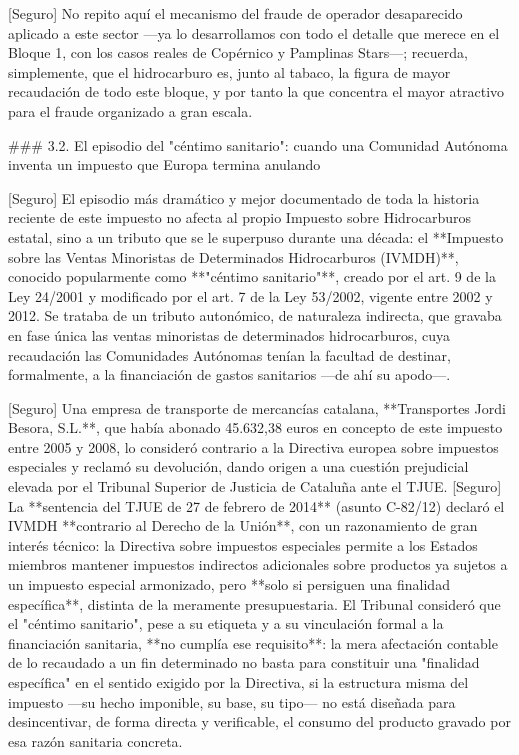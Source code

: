 \documentclass[10pt,a4paper]{article}
\begin{document}
[Seguro] No repito aquí el mecanismo del fraude de operador desaparecido aplicado a este sector —ya lo desarrollamos con todo el detalle que merece en el Bloque 1, con los casos reales de Copérnico y Pamplinas Stars—; recuerda, simplemente, que el hidrocarburo es, junto al tabaco, la figura de mayor recaudación de todo este bloque, y por tanto la que concentra el mayor atractivo para el fraude organizado a gran escala.

### 3.2. El episodio del "céntimo sanitario": cuando una Comunidad Autónoma inventa un impuesto que Europa termina anulando

[Seguro] El episodio más dramático y mejor documentado de toda la historia reciente de este impuesto no afecta al propio Impuesto sobre Hidrocarburos estatal, sino a un tributo que se le superpuso durante una década: el **Impuesto sobre las Ventas Minoristas de Determinados Hidrocarburos (IVMDH)**, conocido popularmente como **"céntimo sanitario"**, creado por el art. 9 de la Ley 24/2001 y modificado por el art. 7 de la Ley 53/2002, vigente entre 2002 y 2012. Se trataba de un tributo autonómico, de naturaleza indirecta, que gravaba en fase única las ventas minoristas de determinados hidrocarburos, cuya recaudación las Comunidades Autónomas tenían la facultad de destinar, formalmente, a la financiación de gastos sanitarios —de ahí su apodo—.

[Seguro] Una empresa de transporte de mercancías catalana, **Transportes Jordi Besora, S.L.**, que había abonado 45.632,38 euros en concepto de este impuesto entre 2005 y 2008, lo consideró contrario a la Directiva europea sobre impuestos especiales y reclamó su devolución, dando origen a una cuestión prejudicial elevada por el Tribunal Superior de Justicia de Cataluña ante el TJUE. [Seguro] La **sentencia del TJUE de 27 de febrero de 2014** (asunto C-82/12) declaró el IVMDH **contrario al Derecho de la Unión**, con un razonamiento de gran interés técnico: la Directiva sobre impuestos especiales permite a los Estados miembros mantener impuestos indirectos adicionales sobre productos ya sujetos a un impuesto especial armonizado, pero **solo si persiguen una finalidad específica**, distinta de la meramente presupuestaria. El Tribunal consideró que el "céntimo sanitario", pese a su etiqueta y a su vinculación formal a la financiación sanitaria, **no cumplía ese requisito**: la mera afectación contable de lo recaudado a un fin determinado no basta para constituir una "finalidad específica" en el sentido exigido por la Directiva, si la estructura misma del impuesto —su hecho imponible, su base, su tipo— no está diseñada para desincentivar, de forma directa y verificable, el consumo del producto gravado por esa razón sanitaria concreta.
\end{document}
